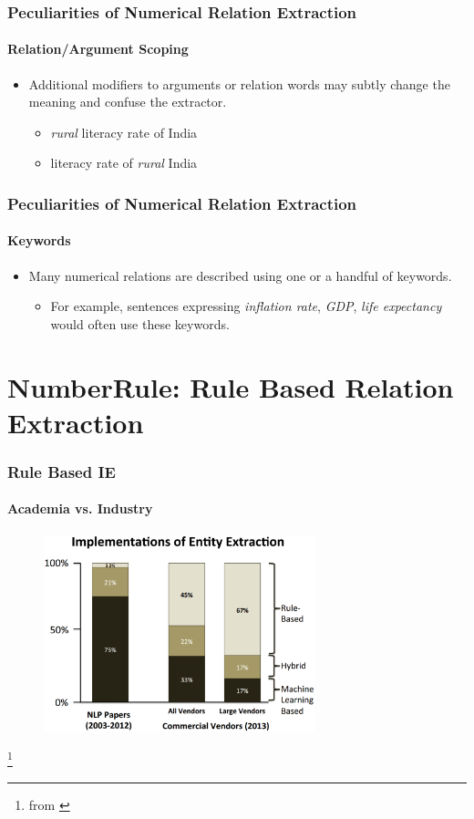 \documentclass{beamer}
\begin{document}
\begin{frame}
\frametitle{Peculiarities of Numerical Relation Extraction}
\framesubtitle{Relation/Argument Scoping}

\begin{itemize}
\item Additional modifiers to arguments or relation words may subtly change the meaning and confuse the extractor.
\begin{itemize}
\item \emph{rural} literacy rate of India
\item literacy rate of \emph{rural} India
\end{itemize}
\end{itemize}

\end{frame}

\begin{frame}
\frametitle{Peculiarities of Numerical Relation Extraction}
\framesubtitle{Keywords}

\begin{itemize}
\item Many numerical relations are described using one or a handful of keywords.
\begin{itemize}
\item For example, sentences expressing \emph{inflation rate}, \emph{GDP}, \emph{life expectancy} would often use these keywords.
\end{itemize}
\end{itemize}

\end{frame}


\section{NumberRule: Rule Based Relation Extraction}

\begin{frame}
\frametitle{Rule Based IE}
\framesubtitle{Academia vs. Industry}

\begin{figure}
\includegraphics[width=0.7\textwidth]{images/longliverulebased.eps}
\end{figure}

\footnote{from \cite{chiticariu2013rule}}

\end{frame}
\end{document}
